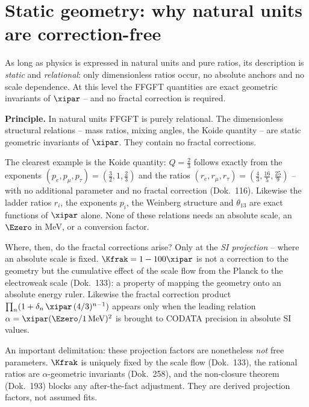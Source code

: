 \section{Static geometry: why natural units are correction-free}

As long as physics is expressed in natural units and pure ratios, its description
is \emph{static} and \emph{relational}: only dimensionless ratios occur, no
absolute anchors and no scale dependence. At this level the FFGFT quantities are
exact geometric invariants of $\xipar$ -- and no fractal correction is required.

\begin{principle}
\textbf{Principle.} In natural units FFGFT is purely relational. The dimensionless
structural relations -- mass ratios, mixing angles, the Koide quantity -- are
static geometric invariants of $\xipar$. They contain no fractal corrections.
\end{principle}

The clearest example is the Koide quantity: $Q=\tfrac{2}{3}$ follows exactly from
the exponents $(p_e,p_\mu,p_\tau)=(\tfrac{3}{2},1,\tfrac{2}{3})$ and the ratios
$(r_e,r_\mu,r_\tau)=(\tfrac{4}{3},\tfrac{16}{5},\tfrac{25}{9})$ -- with no
additional parameter and no fractal correction (Dok.~116). Likewise the ladder
ratios $r_i$, the exponents $p_i$, the Weinberg structure and $\theta_{13}$ are
exact functions of $\xipar$ alone. None of these relations needs an absolute
scale, an $\Ezero$ in MeV, or a conversion factor.

Where, then, do the fractal corrections arise? Only at the \emph{SI projection} --
where an absolute scale is fixed. $\Kfrak=1-100\xipar$ is not a correction to the
geometry but the cumulative effect of the scale flow from the Planck to the
electroweak scale (Dok.~133): a property of mapping the geometry onto an absolute
energy ruler. Likewise the fractal correction product
$\prod_n(1+\delta_n\,\xipar\,(4/3)^{n-1})$ appears only when the leading relation
$\alpha=\xipar(\Ezero/1\,\mathrm{MeV})^2$ is brought to CODATA precision in absolute
SI values.

An important delimitation: these projection factors are nonetheless \emph{not}
free parameters. $\Kfrak$ is uniquely fixed by the scale flow (Dok.~133), the
rational ratios are $\alpha$-geometric invariants (Dok.~258), and the non-closure
theorem (Dok.~193) blocks any after-the-fact adjustment. They are derived
projection factors, not assumed fits.

